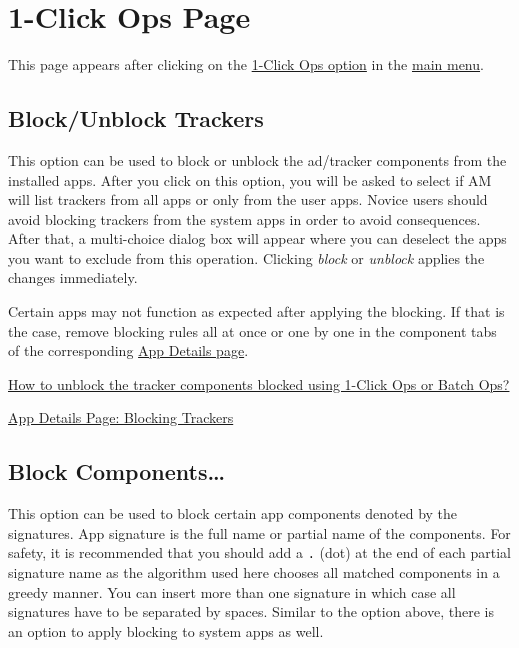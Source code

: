 \section{1-Click Ops Page}\label{sec:1-click-ops-page}
This page appears after clicking on the \hyperref[subsubsec:main:1-click-ops]{1-Click Ops option} in the
\hyperref[subsec:main-page-options-menu]{main menu}.

\subsection{Block/Unblock Trackers}\label{subsec:block-unblock-trackers}
This option can be used to block or unblock the ad/tracker components from the installed apps. After you click on this
option, you will be asked to select if AM will list trackers from all apps or only from the user apps. Novice users
should avoid blocking trackers from the system apps in order to avoid consequences. After that, a multi-choice dialog
box will appear where you can deselect the apps you want to exclude from this operation. Clicking \textit{block} or
\textit{unblock} applies the changes immediately.

\begin{warning}[Notice]
    Certain apps may not function as expected after applying the blocking. If that is the case, remove blocking rules
    all at once or one by one in the component tabs of the corresponding \hyperref[sec:app-details-page]{App Details page}.
\end{warning}

\begin{amseealso}
    \item \hyperref[subsec:faq:how-to-unblock-tracker-components]{How to unblock the tracker components blocked using 1-Click Ops or Batch Ops?}
    \item \hyperref[par:appdetails:blocking-trackers]{App Details Page: Blocking Trackers}
\end{amseealso}

\subsection{Block Components\dots}\label{subsec:block-components-dots}
This option can be used to block certain app components denoted by the signatures. App signature is the full name or
partial name of the components. For safety, it is recommended that you should add a \texttt{.} (dot) at the end of each
partial signature name as the algorithm used here chooses all matched components in a greedy manner. You can insert more
than one signature in which case all signatures have to be separated by spaces. Similar to the option above, there is an
option to apply blocking to system apps as well.

